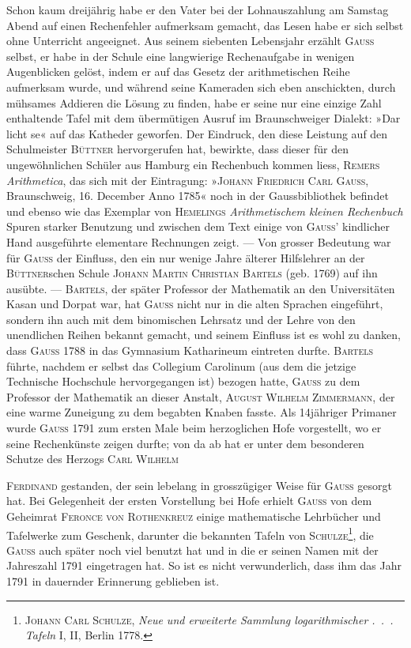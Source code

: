 Schon kaum dreijährig habe er den Vater bei der Lohnauszahlung am
Samstag Abend auf einen Rechenfehler aufmerksam gemacht, das Lesen habe
er sich selbst ohne Unterricht angeeignet. Aus seinem siebenten Lebensjahr
erzählt \textsc{Gauss} selbst, er habe in der Schule eine langwierige Rechenaufgabe
in wenigen Augenblicken gelöst, indem er auf das Gesetz der arithmetischen
Reihe aufmerksam wurde, und während seine Kameraden sich eben anschickten,
durch mühsames Addieren die Lösung zu finden, habe er seine nur eine einzige
Zahl enthaltende Tafel mit dem übermütigen Ausruf im Braunschweiger
Dialekt: »Dar licht se« auf das Katheder geworfen. Der Eindruck, den diese
Leistung auf den Schulmeister \textsc{Büttner} hervorgerufen hat, bewirkte, dass
dieser für den ungewöhnlichen Schüler aus Hamburg ein Rechenbuch kommen
liess, \textsc{Remers} \textit{Arithmetica}, das sich mit der Eintragung: »\textsc{Johann Friedrich
Carl Gauss}, Braunschweig, 16. December Anno 1785« noch in der Gaussbibliothek
befindet und ebenso wie das Exemplar von \textsc{Hemelings} \textit{Arithmetischem
kleinen Rechenbuch} Spuren starker Benutzung und zwischen dem Text einige
von \textsc{Gauss}’ kindlicher Hand ausgeführte elementare Rechnungen zeigt. — Von
grosser Bedeutung war für \textsc{Gauss} der Einfluss, den ein nur wenige Jahre
älterer Hilfslehrer an der \textsc{Büttner}schen Schule \textsc{Johann Martin Christian
Bartels} (geb. 1769) auf ihn ausübte. — \textsc{Bartels}, der später Professor der
Mathematik an den Universitäten Kasan und Dorpat war, hat \textsc{Gauss} nicht
nur in die alten Sprachen eingeführt, sondern ihn auch mit dem binomischen
Lehrsatz und der Lehre von den unendlichen Reihen bekannt gemacht, und
seinem Einfluss ist es wohl zu danken, dass \textsc{Gauss} 1788 in das Gymnasium
Katharineum eintreten durfte. \textsc{Bartels} führte, nachdem er selbst das Collegium
Carolinum (aus dem die jetzige Technische Hochschule hervorgegangen
ist) bezogen hatte, \textsc{Gauss} zu dem Professor der Mathematik an dieser Anstalt,
\textsc{August Wilhelm Zimmermann}, der eine warme Zuneigung zu dem begabten
Knaben fasste. Als 14jähriger Primaner wurde \textsc{Gauss} 1791 zum ersten Male
beim herzoglichen Hofe vorgestellt, wo er seine Rechenkünste zeigen durfte;
von da ab hat er unter dem besonderen Schutze des Herzogs \textsc{Carl Wilhelm}\par
\clearpage{}
\noindent \textsc{Ferdinand} gestanden, der sein lebelang in grosszügiger Weise für \textsc{Gauss} gesorgt
hat. Bei Gelegenheit der ersten Vorstellung bei Hofe erhielt \textsc{Gauss}
von dem Geheimrat \textsc{Feronce von Rothenkreuz} einige mathematische Lehrbücher
und Tafelwerke zum Geschenk, darunter die bekannten Tafeln von
\textsc{Schulze}\footnote{\textsc{Johann Carl Schulze}, \textit{Neue und erweiterte Sammlung logarithmischer .\ .\ . Tafeln} I, II, Berlin 1778.}, die \textsc{Gauss} auch später noch viel benutzt hat und in die er seinen
Namen mit der Jahreszahl 1791 eingetragen hat. So ist es nicht verwunderlich,
dass ihm das Jahr 1791 in dauernder Erinnerung geblieben ist.


